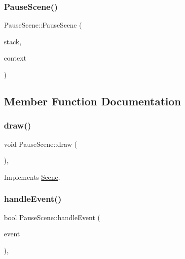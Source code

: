 \subsubsection{\texorpdfstring{Pause\+Scene()}{PauseScene()}}
{\footnotesize\ttfamily Pause\+Scene\+::\+Pause\+Scene (\begin{DoxyParamCaption}\item[{\hyperlink{class_scene_stack}{Scene\+Stack} \&}]{stack,  }\item[{\hyperlink{struct_scene_1_1_context}{Context}}]{context }\end{DoxyParamCaption})}



\subsection{Member Function Documentation}
\mbox{\label{class_pause_scene_abfd1398a064a83b3ae6ac5fd98aebf05}} 
\subsubsection{\texorpdfstring{draw()}{draw()}}
{\footnotesize\ttfamily void Pause\+Scene\+::draw (\begin{DoxyParamCaption}{ }\end{DoxyParamCaption})\hspace{0.3cm}{\ttfamily [override]}, {\ttfamily [virtual]}}



Implements \hyperlink{class_scene_a789c16961aa1e316b2a4a05b95187546}{Scene}.

\mbox{\label{class_pause_scene_adeb06e37e0a2afa297ddbe795c3cbe94}} 
\subsubsection{\texorpdfstring{handle\+Event()}{handleEvent()}}
{\footnotesize\ttfamily bool Pause\+Scene\+::handle\+Event (\begin{DoxyParamCaption}\item[{const sf\+::\+Event \&}]{event }\end{DoxyParamCaption})\hspace{0.3cm}{\ttfamily [override]}, {\ttfamily [virtual]}}



